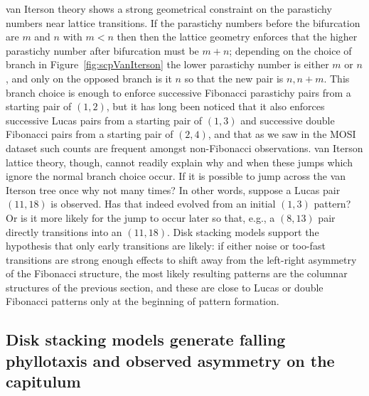 \documentclass[a4paper,10pt]{amsart}
\newlength{\jfigwidth}
\newcommand{\pdffig}[3]{\jdofig{#1}{#2}{#3}{Figures}{.pdf}}
\newcommand{\jdofig}[5]{
	\begin{figure}\centering\texttt{[image: \#4/\#1\#5]} \caption{#2}\label{fig:#1}\end{figure}
}
\begin{document}
van Iterson theory shows a strong geometrical constraint on the parastichy numbers near lattice transitions. If the parastichy numbers before the bifurcation are $m$ and $n$ with $m<n$ then then the lattice geometry enforces that the higher parastichy number after bifurcation must be $m+n$; depending on the choice of branch in Figure~\ref{fig:scpVanIterson} the lower parastichy number is either $m$ or $n$, and only on the opposed branch is it $n$ so that the new pair is $n,n+m$. This branch choice is enough to enforce successive Fibonacci parastichy pairs from a starting pair of $(1,2)$, but it has long  been noticed that it also enforces successive Lucas pairs from a starting pair of $(1,3)$ and successive double Fibonacci pairs from a starting pair of $(2,4)$, and that as we saw in the MOSI dataset such counts are frequent amongst non-Fibonacci observations. van Iterson lattice theory, though, cannot readily explain why and when these jumps which  ignore the normal branch choice occur.  If  it is possible to jump across the van Iterson tree once why not many times? In other words, suppose a Lucas pair $(11,18)$ is observed. Has that indeed evolved from an initial $(1,3)$ pattern? Or is it more likely for the jump to occur later so that, e.g., a $(8,13)$ pair directly transitions into an $(11,18)$. 
Disk stacking models support the hypothesis that only early transitions are likely: if either noise or too-fast transitions are strong enough effects to shift away from the left-right asymmetry of the  Fibonacci structure, the most likely resulting patterns are the columnar structures of the previous section, and these are close to Lucas or double Fibonacci patterns only at the beginning of pattern formation. 



\subsection{Disk stacking models generate falling phyllotaxis and observed asymmetry on the capitulum}
\end{document}
